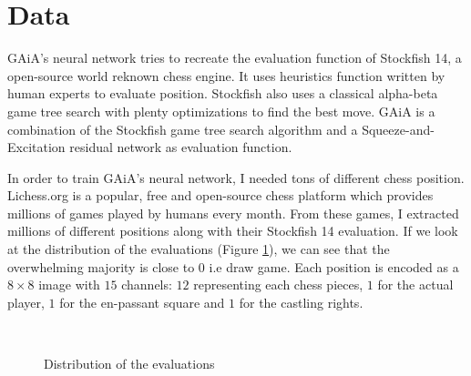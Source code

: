 \documentclass[unnumsec,webpdf,contemporary,large]{Article}%
\theoremstyle{thmstyleone}%
\theoremstyle{thmstyletwo}%
\theoremstyle{thmstylethree}%
\begin{document}
\section{Data}
GAiA's neural network tries to recreate the evaluation function of Stockfish 14\cite{stockfish},
a open-source world reknown chess engine. It uses heuristics function written
by human experts to evaluate position. Stockfish also uses a classical
alpha-beta game tree search with plenty optimizations to find the best move.
GAiA is a combination of the Stockfish game tree search algorithm and a
Squeeze-and-Excitation residual network as evaluation function.

In order to train GAiA's neural network, I needed tons of different
chess position. Lichess.org\cite{lichess} is a popular, free and open-source
chess platform which provides millions of games played by humans every month.
From these games, I extracted millions of different positions along with their
Stockfish 14 evaluation. If we look at the distribution of the evaluations
(Figure \ref{fig:distribution}), we can see that the overwhelming majority
is close to $0$ i.e draw game.
Each position is encoded as a $8\times8$ image with $15$ channels: 
$12$ representing each chess pieces, $1$ for the actual player, $1$
for the en-passant square and $1$ for the castling rights.


\begin{figure}[H]
  \captionsetup[subfigure]{labelformat=empty}
  \centering
  \\
  \caption{Distribution of the evaluations}
  \label{fig:distribution}
\end{figure}
\end{document}
